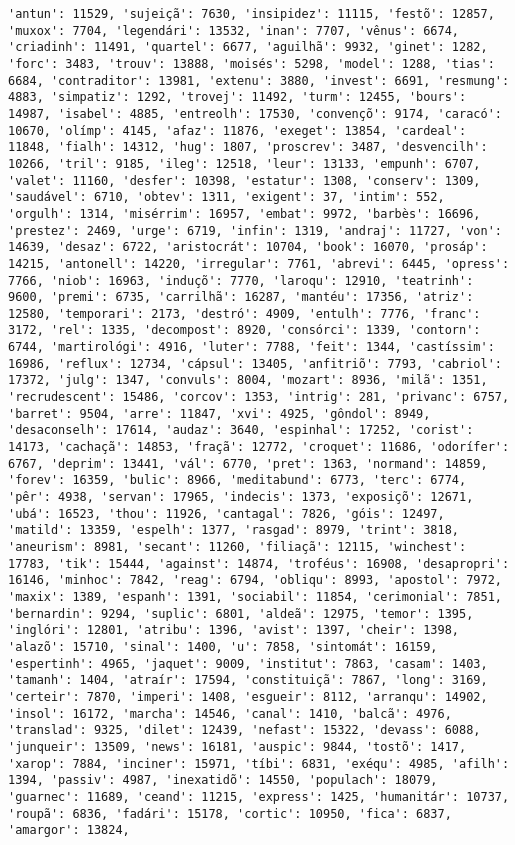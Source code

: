 \begin{Verbatim}[commandchars=\\\{\}]
'antun': 11529, 'sujeiçã': 7630, 'insipidez': 11115, 'festõ': 12857, 'muxox': 7704, 'legendári': 13532, 'inan': 7707, 'vênus': 6674, 'criadinh': 11491, 'quartel': 6677, 'aguilhã': 9932, 'ginet': 1282, 'forc': 3483, 'trouv': 13888, 'moisés': 5298, 'model': 1288, 'tias': 6684, 'contraditor': 13981, 'extenu': 3880, 'invest': 6691, 'resmung': 4883, 'simpatiz': 1292, 'trovej': 11492, 'turm': 12455, 'bours': 14987, 'isabel': 4885, 'entreolh': 17530, 'convençõ': 9174, 'caracó': 10670, 'olímp': 4145, 'afaz': 11876, 'exeget': 13854, 'cardeal': 11848, 'fialh': 14312, 'hug': 1807, 'proscrev': 3487, 'desvencilh': 10266, 'tril': 9185, 'ileg': 12518, 'leur': 13133, 'empunh': 6707, 'valet': 11160, 'desfer': 10398, 'estatur': 1308, 'conserv': 1309, 'saudável': 6710, 'obtev': 1311, 'exigent': 37, 'intim': 552, 'orgulh': 1314, 'misérrim': 16957, 'embat': 9972, 'barbès': 16696, 'prestez': 2469, 'urge': 6719, 'infin': 1319, 'andraj': 11727, 'von': 14639, 'desaz': 6722, 'aristocrát': 10704, 'book': 16070, 'prosáp': 14215, 'antonell': 14220, 'irregular': 7761, 'abrevi': 6445, 'opress': 7766, 'niob': 16963, 'induçõ': 7770, 'laroqu': 12910, 'teatrinh': 9600, 'premi': 6735, 'carrilhã': 16287, 'mantéu': 17356, 'atriz': 12580, 'temporari': 2173, 'destró': 4909, 'entulh': 7776, 'franc': 3172, 'rel': 1335, 'decompost': 8920, 'consórci': 1339, 'contorn': 6744, 'martirológi': 4916, 'luter': 7788, 'feit': 1344, 'castíssim': 16986, 'reflux': 12734, 'cápsul': 13405, 'anfitriõ': 7793, 'cabriol': 17372, 'julg': 1347, 'convuls': 8004, 'mozart': 8936, 'milã': 1351, 'recrudescent': 15486, 'corcov': 1353, 'intrig': 281, 'privanc': 6757, 'barret': 9504, 'arre': 11847, 'xvi': 4925, 'gôndol': 8949, 'desaconselh': 17614, 'audaz': 3640, 'espinhal': 17252, 'corist': 14173, 'cachaçã': 14853, 'fraçã': 12772, 'croquet': 11686, 'odorífer': 6767, 'deprim': 13441, 'vál': 6770, 'pret': 1363, 'normand': 14859, 'forev': 16359, 'bulic': 8966, 'meditabund': 6773, 'terc': 6774, 'pêr': 4938, 'servan': 17965, 'indecis': 1373, 'exposiçõ': 12671, 'ubá': 16523, 'thou': 11926, 'cantagal': 7826, 'góis': 12497, 'matild': 13359, 'espelh': 1377, 'rasgad': 8979, 'trint': 3818, 'aneurism': 8981, 'secant': 11260, 'filiaçã': 12115, 'winchest': 17783, 'tik': 15444, 'against': 14874, 'troféus': 16908, 'desapropri': 16146, 'minhoc': 7842, 'reag': 6794, 'obliqu': 8993, 'apostol': 7972, 'maxix': 1389, 'espanh': 1391, 'sociabil': 11854, 'cerimonial': 7851, 'bernardin': 9294, 'suplic': 6801, 'aldeã': 12975, 'temor': 1395, 'inglóri': 12801, 'atribu': 1396, 'avist': 1397, 'cheir': 1398, 'alazõ': 15710, 'sinal': 1400, 'u': 7858, 'sintomát': 16159, 'espertinh': 4965, 'jaquet': 9009, 'institut': 7863, 'casam': 1403, 'tamanh': 1404, 'atraír': 17594, 'constituiçã': 7867, 'long': 3169, 'certeir': 7870, 'imperi': 1408, 'esgueir': 8112, 'arranqu': 14902, 'insol': 16172, 'marcha': 14546, 'canal': 1410, 'balcã': 4976, 'translad': 9325, 'dilet': 12439, 'nefast': 15322, 'devass': 6088, 'junqueir': 13509, 'news': 16181, 'auspic': 9844, 'tostõ': 1417, 'xarop': 7884, 'inciner': 15971, 'tíbi': 6831, 'exéqu': 4985, 'afilh': 1394, 'passiv': 4987, 'inexatidõ': 14550, 'populach': 18079, 'guarnec': 11689, 'ceand': 11215, 'express': 1425, 'humanitár': 10737, 'roupã': 6836, 'fadári': 15178, 'cortic': 10950, 'fica': 6837, 'amargor': 13824, 
\end{Verbatim}
